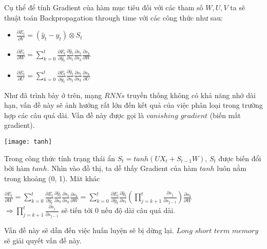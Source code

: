 Cụ thể để tính Gradient của hàm mục tiêu đối với các tham số $W, U, V$ ta sẽ thuật toán Backpropagation through time với các công thức như sau:
		\begin{itemize}[label = \textendash]
			\item $\frac{\partial E_{t}}{\partial V} = (\hat{y}_{t} - y_{t}) \otimes S_{t}$
			\item $\frac{\partial E_t}{\partial W} = \sum\limits_{k=0}^{t} \frac{\partial E_t}{\partial \hat{y}_t}\frac{\partial\hat{y}_t}{\partial s_t}\frac{\partial s_t}{\partial s_k}\frac{\partial s_k}{\partial W}$
			\item $\frac{\partial E_t}{\partial U} = \sum\limits_{k=0}^{t} \frac{\partial E_t}{\partial \hat{y}_t}\frac{\partial\hat{y}_t}{\partial s_t}\frac{\partial s_t}{\partial s_k}\frac{\partial s_k}{\partial U}$
		\end{itemize}
Như đã trình bày ở trên, mạng $RNNs$ truyền thống không có khả năng nhớ dài hạn, vấn đề này sẽ ảnh hưởng rất lớn đến kết quả của việc phân loại trong trường hợp các câu quá dài. Vấn đề này được gọi là $vanishing$ $gradient$ (biến mất gradient).
	\begin{center}
	  \texttt{[image: tanh]}
	  \label{tanh}
	\end{center}
Trong công thức tính trạng thái ẩn $S_{t} = tanh(UX_{t} + S_{t-1}W)$, $S_{t}$ được biến đổi bởi hàm $tanh$. Nhìn vào đồ thị, ta dễ thấy Gradient của hàm $tanh$ luôn nằm trong khoảng (0, 1). Măt khác
	\begin{center}
		$\frac{\partial E_t}{\partial W} = \sum\limits_{k=0}^{t} \frac{\partial E_t}{\partial \hat{y}_t}\frac{\partial\hat{y}_t}{\partial s_t}\frac{\partial s_t}{\partial s_k}\frac{\partial s_k}{\partial W}=\sum\limits_{k=0}^{t} \frac{\partial E_t}{\partial \hat{y}_t}\frac{\partial\hat{y}_t}{\partial s_t} \left(\prod\limits_{j=k+1}^{t} \frac{\partial s_j}{\partial s_{j-1}}\right) \frac{\partial s_k}{\partial W}$\\
		$\Rightarrow \prod\limits_{j=k+1}^{t} \frac{\partial s_j}{\partial s_{j-1}}$ sẽ tiến tới 0 nếu độ dài câu quá dài. 
	\end{center}
Vấn đề này sẽ dẫn đến việc huấn luyện sẽ bị dừng lại. $Long$ $short$ $term$ $memory$ sẽ giải quyết vấn đề này.

